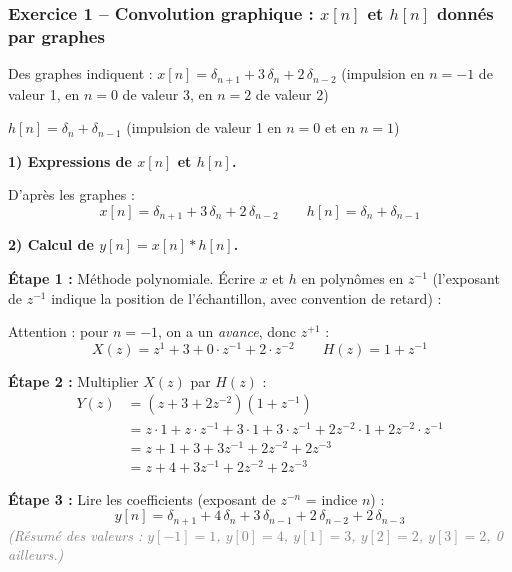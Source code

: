 \documentclass[12pt,a4paper]{article}
\newcommand{\step}[1]{\textcolor{coursbleu}{\textbf{Étape #1 :}}}
\newcommand{\explication}[1]{\textit{\textcolor{gray}{(#1)}}}
\newcommand{\encadre}[1]{\boxed{#1}}
\begin{document}
\subsubsection*{Exercice 1 -- Convolution graphique : $x[n]$ et $h[n]$ donnés par graphes}

\begin{tcolorbox}[coursbox, title=Lecture des graphes]
Des graphes indiquent :
$x[n] = \delta_{n+1} + 3\,\delta_n + 2\,\delta_{n-2}$
\quad (impulsion en $n=-1$ de valeur 1, en $n=0$ de valeur 3, en $n=2$ de valeur 2)

$h[n] = \delta_n + \delta_{n-1}$
\quad (impulsion de valeur 1 en $n=0$ et en $n=1$)
\end{tcolorbox}

\begin{tcolorbox}[corrbox, title=Correction Exercice 1 -- Convolution]
\textbf{1) Expressions de $x[n]$ et $h[n]$.}

D'après les graphes :
\[
  x[n] = \delta_{n+1} + 3\,\delta_n + 2\,\delta_{n-2}
  \qquad
  h[n] = \delta_n + \delta_{n-1}
\]

\textbf{2) Calcul de $y[n] = x[n] * h[n]$.}

\step{1} Méthode polynomiale. Écrire $x$ et $h$ en polynômes en $z^{-1}$
(l'exposant de $z^{-1}$ indique la position de l'échantillon, avec convention de retard) :

Attention : pour $n=-1$, on a un \textit{avance}, donc $z^{+1}$ :
\[
  X(z) = z^1 + 3 + 0\cdot z^{-1} + 2\cdot z^{-2}
  \qquad
  H(z) = 1 + z^{-1}
\]

\step{2} Multiplier $X(z)$ par $H(z)$ :
\begin{align*}
  Y(z) &= (z + 3 + 2z^{-2})(1 + z^{-1}) \\
       &= z\cdot 1 + z\cdot z^{-1} + 3\cdot 1 + 3\cdot z^{-1} + 2z^{-2}\cdot 1 + 2z^{-2}\cdot z^{-1} \\
       &= z + 1 + 3 + 3z^{-1} + 2z^{-2} + 2z^{-3} \\
       &= z + 4 + 3z^{-1} + 2z^{-2} + 2z^{-3}
\end{align*}

\step{3} Lire les coefficients (exposant de $z^{-n}$ = indice $n$) :
\[
  \encadre{y[n] = \delta_{n+1} + 4\,\delta_n + 3\,\delta_{n-1} + 2\,\delta_{n-2} + 2\,\delta_{n-3}}
\]
\explication{Résumé des valeurs : $y[-1]=1$, $y[0]=4$, $y[1]=3$, $y[2]=2$, $y[3]=2$, 0 ailleurs.}
\end{tcolorbox}

\end{document}
